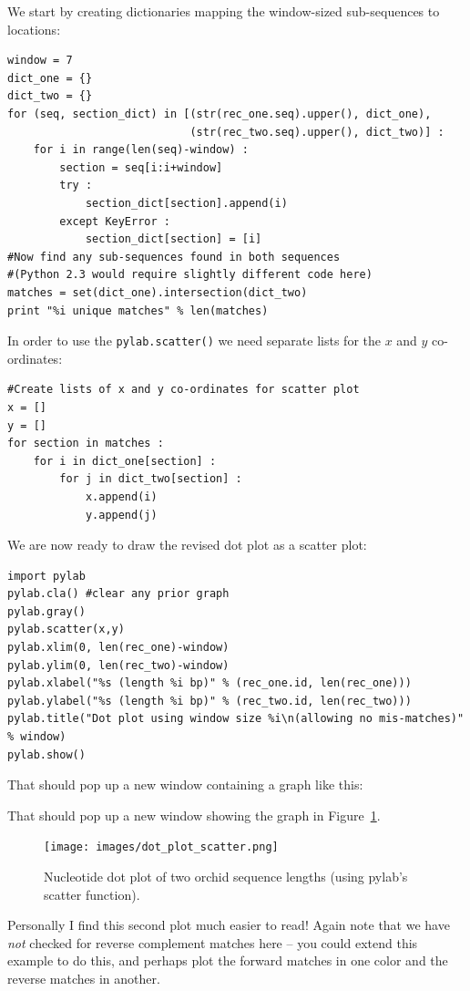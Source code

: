 \documentclass{report}
\begin{document}
We start by creating dictionaries mapping the window-sized sub-sequences to locations:
\begin{verbatim}
window = 7
dict_one = {}
dict_two = {}
for (seq, section_dict) in [(str(rec_one.seq).upper(), dict_one),
                            (str(rec_two.seq).upper(), dict_two)] :
    for i in range(len(seq)-window) :
        section = seq[i:i+window]
        try :
            section_dict[section].append(i)
        except KeyError :
            section_dict[section] = [i]
#Now find any sub-sequences found in both sequences
#(Python 2.3 would require slightly different code here)
matches = set(dict_one).intersection(dict_two)
print "%i unique matches" % len(matches)
\end{verbatim}
\noindent In order to use the \verb|pylab.scatter()| we need separate lists for the $x$ and $y$ co-ordinates:
\begin{verbatim}
#Create lists of x and y co-ordinates for scatter plot
x = []
y = []
for section in matches :
    for i in dict_one[section] :
        for j in dict_two[section] :
            x.append(i)
            y.append(j)
\end{verbatim}
\noindent We are now ready to draw the revised dot plot as a scatter plot:
\begin{verbatim}
import pylab
pylab.cla() #clear any prior graph
pylab.gray()
pylab.scatter(x,y)
pylab.xlim(0, len(rec_one)-window)
pylab.ylim(0, len(rec_two)-window)
pylab.xlabel("%s (length %i bp)" % (rec_one.id, len(rec_one)))
pylab.ylabel("%s (length %i bp)" % (rec_two.id, len(rec_two)))
pylab.title("Dot plot using window size %i\n(allowing no mis-matches)" % window)
pylab.show()
\end{verbatim}
%
%
\begin{htmlonly}
\noindent That should pop up a new window containing a graph like this:


\end{htmlonly}
\begin{latexonly}
\noindent That should pop up a new window showing the graph in Figure~\ref{fig:nuc-dot-plot-scatter}.
\begin{figure}[htbp]
\centering
\texttt{[image: images/dot\_plot\_scatter.png]}
\caption{Nucleotide dot plot of two orchid sequence lengths (using pylab's scatter function).}
\label{fig:nuc-dot-plot-scatter}
\end{figure}\end{latexonly}
Personally I find this second plot much easier to read!
Again note that we have \emph{not} checked for reverse complement matches here
-- you could extend this example to do this, and perhaps plot the forward
matches in one color and the reverse matches in another.
\end{document}
